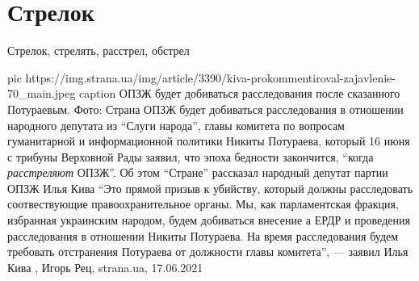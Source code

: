  
 
 
 
 
\chapter{Стрелок}

Стрелок, стрелять, расстрел, обстрел

\ifcmt
  pic https://img.strana.ua/img/article/3390/kiva-prokommentiroval-zajavlenie-70_main.jpeg
	caption ОПЗЖ будет добиваться расследования после сказанного Потураевым. Фото: Страна 
\fi
ОПЗЖ будет добиваться расследования в отношении народного депутата из
\enquote{Слуги народа}, главы комитета по вопросам гуманитарной и
информационной политики Никиты Потураева, который 16 июня с трибуны Верховной
Рады заявил, что эпоха бедности закончится, \enquote{когда \emph{расстреляют}
ОПЗЖ}.  Об этом \enquote{Стране} рассказал народный депутат партии ОПЗЖ Илья
Кива \enquote{Это прямой призыв к убийству, который должны расследовать
соотвествующие правоохранительное органы. Мы, как парламентская фракция,
избранная украинским народом, будем добиваться внесение а ЕРДР и проведения
расследования в отношении Никиты Потураева. На время расследования будем
требовать отстранения Потураева от должности главы комитета}, — заявил Илья
Кива
, 
Игорь Рец, strana.ua, 17.06.2021
